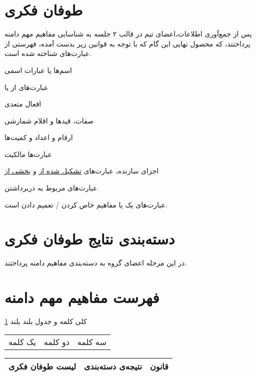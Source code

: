 \documentclass[12pt,svgnames,oneside]{book}
\newcounter{itemadded}
\let\LaTeXStandardEnumerateBegin\enumerate
\let\LaTeXStandardEnumerateEnd\endenumerate
\renewenvironment{enumerate}{%
	\LaTeXStandardEnumerateBegin%
	\setcounter{itemadded}{0}
}{%
	\LaTeXStandardEnumerateEnd%
}%
\begin{document}
		\section{طوفان فکری}
			پس از جمع‌آوری اطلاعات،‌اعضای تیم در قالب ۲ جلسه به شناسایی مفاهیم مهم دامنه پرداختند، که محصول نهایی این گام که با توجه به قوانین زیر بدست آمده، فهرستی از عبارت‌های شناخته شده است.
			\begin{enumerate}
				\item اسم‌‌ها یا عبارات اسمی
				\item عبارت‌های  از 
				یا
				\item افعال متعدی
			    \item صفات، قید‌‌ها و اقلام شمارشی
				\item ارقام و اعداد و کمیت‌ها
				\item عبارت‌ها مالکیت
				\item اجزای سازنده، عبارت‌های \underline{تشکیل شده از} و \underline{بخشی از}
				\item عبارت‌های مربوط به دربرداشتن
				\item عبارت‌های  
				یک  یا مفاهیم خاص کردن / تعمیم دادن است.
			\end{enumerate}
		
		\section{دسته‌بندی نتایج طوفان فکری}
			در این مرحله اعضای گروه به دسته‌بندی مفاهیم دامنه پرداختند.
			
		\section{فهرست مفاهیم مهم دامنه}
			کلی کلمه و جدول بلند بلند \ref{table:domain}
			
			\begin{longtable}{ccc}
				یک کلمه
				\footnotemark[2] &
				دو کلمه
				\footnotemark[10]&
				سه کلمه 
				\footnotemark \\
			\end{longtable}
		
			\begin{table}[H]
				\caption{مفاهیم مهم دامنه}
				\begin{longtable}{|c|c|c|}
					\hline
					لیست طوفان فکری &
					نتیجه‌ی دسته‌بندی &
					قانون \\
					\hline
				\end{longtable}
				\label{table:domain}
			\end{table}
\end{document}
